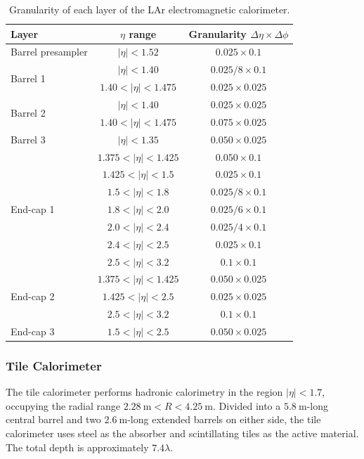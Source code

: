 \begin{table}[htbp]
	\centering
	\begin{tabular}{|l|c|c|}
		\hline
		Layer & $\eta$ range & Granularity $\Delta\eta\times\Delta\phi$ \\
		\hline
		Barrel presampler & $|\eta|<1.52$ & $0.025\times0.1$ \\
		\hline
		\multirow{2}{*}{Barrel 1} & $|\eta|<1.40$ & $0.025 / 8 \times 0.1$ \\
		 & $1.40<|\eta|<1.475$ & $0.025\times0.025$ \\
		\hline
		\multirow{2}{*}{Barrel 2} & $|\eta|<1.40$ & $0.025\times0.025$ \\
		 & $1.40<|\eta|<1.475$ & $0.075\times 0.025$ \\
		\hline
		Barrel 3 & $|\eta|<1.35$ & $0.050\times0.025$ \\
		\hline
		\hline
		\multirow{7}{*}{End-cap 1} & $1.375<|\eta|<1.425$ & $0.050\times0.1$ \\
		 & $1.425<|\eta|<1.5$ & $0.025\times0.1$ \\
		 & $1.5<|\eta|<1.8$ & $0.025/8\times0.1$ \\
		 & $1.8<|\eta|<2.0$ & $0.025/6\times0.1$ \\
		 & $2.0<|\eta|<2.4$ & $0.025/4\times0.1$ \\
		 & $2.4<|\eta|<2.5$ & $0.025\times0.1$ \\
		 & $2.5<|\eta|<3.2$ & $0.1\times0.1$ \\
		\hline
		\multirow{3}{*}{End-cap 2} & $1.375<|\eta|<1.425$ & $0.050\times0.025$ \\
		 & $1.425<|\eta|<2.5$ & $0.025\times0.025$ \\
		 & $2.5<|\eta|<3.2$ & $0.1\times0.1$ \\
		\hline
		End-cap 3 & $1.5<|\eta|<2.5$ & $0.050\times0.025$ \\
		\hline
	\end{tabular}
	\caption{Granularity of each layer of the LAr electromagnetic calorimeter.}
	\label{table:ATLAS-LAr-segmentation}
\end{table}


\subsubsection{Tile Calorimeter}\label{sec:ATLAS-calorimeters-tile}
The tile calorimeter performs hadronic calorimetry in the region $|\eta|<1.7$, occupying the radial range $2.28~\mbox{m}<R<4.25~\mbox{m}$. Divided into a $5.8~\mbox{m}$-long central barrel and two $2.6~\mbox{m}$-long extended barrels on either side, the tile calorimeter uses steel as the absorber and scintillating tiles as the active material. The total depth is approximately $7.4\lambda$. 

